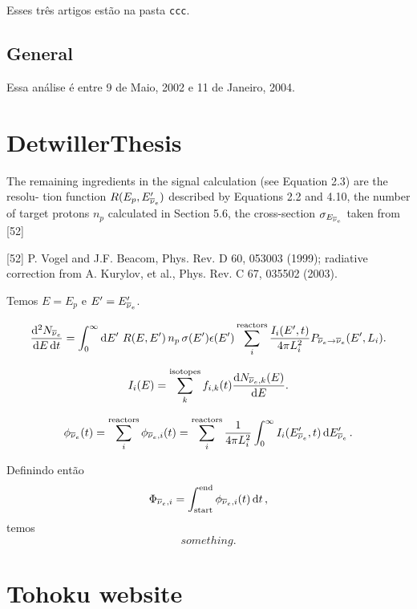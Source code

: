 \documentclass[a4paper,fleqn,12pt]{article}
\begin{document}
Esses três artigos estão na pasta \texttt{ccc}.

\subsection{General}

Essa análise é entre 9 de Maio, 2002 e 11 de Janeiro, 2004.

\section{DetwillerThesis}

The remaining ingredients in the signal calculation (see Equation 2.3) are the resolu-
tion function $R(E_p, E_{\overline{\nu}_e}')$ described by Equations 2.2 and 4.10, the number of target
protons $n_p$ calculated in Section 5.6, the cross-section $\sigma_{E_{\overline{\nu}_e}}$ taken from [52]


[52] P. Vogel and J.F. Beacom, Phys. Rev. D 60, 053003 (1999); radiative correction
from A. Kurylov, et al., Phys. Rev. C 67, 035502 (2003).

Temos $E = E_p$ e $E' = E_{\overline{\nu}_e}'$.

$$
\frac{\dd[2]{N_{\overline{\nu}_e}}}{\dd{E}\dd{t}} =
\int_0^\infty \dd{E'} \, R(E, E') \, n_p \, \sigma(E') \epsilon(E')
\sum_{i}^{\text{reactors}} \frac{I_i(E', t)}{4\pi L_i^2}
P_{\overline{\nu}_e \to \overline{\nu}_e}(E', L_i).
$$

$$
I_i(E) = \sum^{\text{isotopes}}_{k} f_{i,k}(t)
\dv{N_{\overline{\nu}_e, k} (E)}{E}.
$$

$$
\phi_{\overline{\nu}_e}(t) =
\sum_{i}^{\text{reactors}} \phi_{\overline{\nu}_e, i}(t) =
\sum_{i}^{\text{reactors}} \frac{1}{4\pi L_i^2}
\int_0^\infty I_i(E_{\overline{\nu}_e}', t) \dd{E_{\overline{\nu}_e}'}.
$$

Definindo então
$$
\Phi_{\overline{\nu}_e, i} = \int_{\text{start}}^{\text{end}} \phi_{\overline{\nu}_e, i}(t) \dd{t},
$$
temos
$$
something.
$$

\section{Tohoku website}
\end{document}

